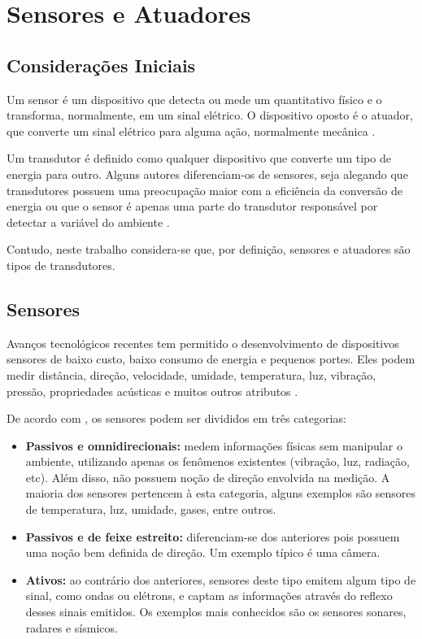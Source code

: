 \chapter{Sensores e Atuadores}
\label{cap:3}

\section{Considerações Iniciais}
Um sensor é um dispositivo que detecta ou mede um quantitativo físico e o transforma, normalmente, em um sinal
elétrico. O dispositivo oposto é o atuador, que converte um sinal elétrico para alguma ação, normalmente
mecânica \cite{sinclair2001}.

Um transdutor é definido como qualquer dispositivo que converte um tipo de energia para outro. Alguns
autores diferenciam-os de sensores, seja alegando que transdutores possuem uma preocupação maior com a eficiência
da conversão de energia ou que o sensor é apenas uma parte do transdutor responsável por detectar a variável
do ambiente \cite{sinclair2001,kondrasovas2013}.

Contudo, neste trabalho considera-se que, por definição, sensores e atuadores são tipos de transdutores.

\section{Sensores}
Avanços tecnológicos recentes tem permitido o desenvolvimento de dispositivos sensores de baixo custo, baixo
consumo de energia e pequenos portes. Eles podem medir distância, direção, velocidade, umidade, temperatura, luz,
vibração, pressão, propriedades acústicas e muitos outros atributos \cite{hai_nayak_stojmenovic2010}.

De acordo com , os sensores podem ser divididos em três categorias:
\begin{itemize}
	\item \textbf{Passivos e omnidirecionais:} medem informações físicas sem manipular o ambiente,
	utilizando apenas os fenômenos existentes (vibração, luz, radiação, etc). Além disso, não possuem
	noção de direção envolvida na medição. A maioria dos sensores pertencem à esta categoria, alguns
	exemplos são sensores de temperatura, luz, umidade, gases, entre outros.
	\item \textbf{Passivos e de feixe estreito:} diferenciam-se dos anteriores pois possuem uma noção bem
	definida de direção. Um exemplo típico é uma câmera.
	\item \textbf{Ativos:} ao contrário dos anteriores, sensores deste tipo emitem algum tipo de sinal,
	como ondas ou elétrons, e captam as informações através do reflexo desses sinais emitidos. Os
	exemplos mais conhecidos são os sensores sonares, radares e sísmicos.
\end{itemize}

